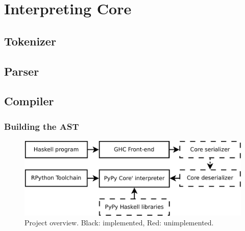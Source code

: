 
\section{Interpreting Core}

\subsection{Tokenizer}

\subsection{Parser}

\subsection{Compiler}

\subsubsection{Building the AST}


\begin{figure}
\includegraphics[width=\textwidth]{diags/overview}
\caption{Project overview. Black: implemented, Red: unimplemented.}
\end{figure}


